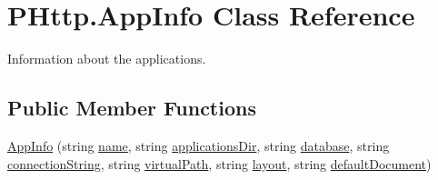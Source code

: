 \hypertarget{class_p_http_1_1_app_info}{}\section{P\+Http.\+App\+Info Class Reference}
\label{class_p_http_1_1_app_info}


Information about the applications.  


\subsection*{Public Member Functions}
\begin{DoxyCompactItemize}
\item 
\hyperlink{class_p_http_1_1_app_info_a8ac157ce05450f6cc1d2a72eb26db830}{App\+Info} (string \hyperlink{class_p_http_1_1_app_info_a2d2a1695a1ebcee1c6d045f291c127c8}{name}, string \hyperlink{class_p_http_1_1_app_info_abc0623c7d5a48d5d0e68930da311a74f}{applications\+Dir}, string \hyperlink{class_p_http_1_1_app_info_a51ede3fc74bb3364787a2016c976a3bc}{database}, string \hyperlink{class_p_http_1_1_app_info_ac319cff1fe0fbd1de94f3bd376122646}{connection\+String}, string \hyperlink{class_p_http_1_1_app_info_a4432977962617879b03ff44ea66e55fa}{virtual\+Path}, string \hyperlink{class_p_http_1_1_app_info_a9f665f7d26a23c651e32eeb9b0a9b655}{layout}, string \hyperlink{class_p_http_1_1_app_info_ac898312eef3e4a7430adce0fb35e7114}{default\+Document})
\end{DoxyCompactItemize}
